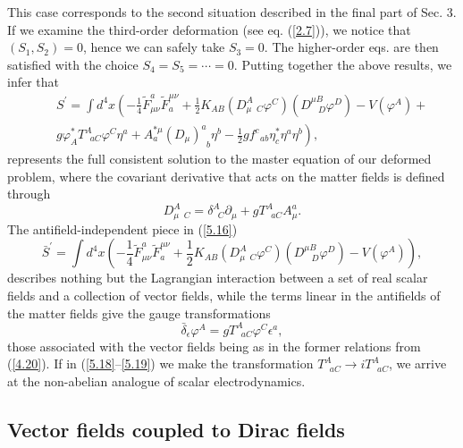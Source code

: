 \documentclass[a4paper,12pt]{article}
\begin{document}
This case corresponds to the second
situation described in the final part of
Sec. 3. If we examine the third-order
deformation (see eq. (\ref{2.7})), we
notice that $\left( S_{1},S_{2}\right) =0$,
hence we can safely take $S_{3}=0
$. The higher-order eqs. are then
satisfied with the choice $%
S_{4}=S_{5}=\cdots =0$. Putting together
the above results, we infer that
\begin{eqnarray}
&&S^{\prime }=\int d^{4}x\left( -
\frac{1}{4}\tilde{F}_{\mu \nu }^{a}\tilde{F}%
_{a}^{\mu \nu }+\frac{1}{2}K_{AB}
\left( D_{\mu \;\;C}^{A}\varphi ^{C}\right)
\left( D_{\;\;\;D}^{\mu B}\varphi ^{D}\right) -
V\left( \varphi ^{A}\right)
+\right.   \nonumber \\
&&\left. g\varphi _{A}^{*}
T_{\;\;aC}^{A}\varphi ^{C}\eta ^{a}+A_{a}^{*\mu
}\left( D_{\mu }\right) _{\;\;b}^{a}
\eta ^{b}-\frac{1}{2}gf_{\;\;ab}^{c}\eta
_{c}^{*}\eta ^{a}\eta ^{b}\right) ,  \label{5.16}
\end{eqnarray}
represents the full consistent solution
to the master equation of our
deformed problem, where the covariant
derivative that acts on the matter
fields is defined through
\begin{equation}
D_{\mu \;\;C}^{A}=\delta _{\;\;C}^{A}\partial _{\mu }+
gT_{\;\;aC}^{A}A_{\mu
}^{a}.  \label{5.17}
\end{equation}
The antifield-independent piece in (\ref{5.16})
\begin{equation}
\bar{S}^{\prime }=\int d^{4}x\left( -
\frac{1}{4}\tilde{F}_{\mu \nu }^{a}%
\tilde{F}_{a}^{\mu \nu }+\frac{1}{2}
K_{AB}\left( D_{\mu \;\;C}^{A}\varphi
^{C}\right) \left( D_{\;\;\;D}^{\mu B}
\varphi ^{D}\right) -V\left( \varphi
^{A}\right) \right) ,  \label{5.18}
\end{equation}
describes nothing but the Lagrangian
interaction between a set of real
scalar fields and a collection of vector
fields, while the terms linear in
the antifields of the matter fields give
the gauge transformations
\begin{equation}
\bar{\delta}_{\epsilon }\varphi ^{A}=
gT_{\;\;aC}^{A}\varphi ^{C}\epsilon
^{a},  \label{5.19}
\end{equation}
those associated with the vector fields
being as in the former relations
from (\ref{4.20}). If in
(\ref{5.18}--\ref{5.19}) we make the transformation
$T_{\;\;aC}^{A}\rightarrow iT_{\;\;aC}^{A}$,
we arrive at the non-abelian
analogue of scalar electrodynamics.

\subsection{Vector fields coupled to Dirac fields}
\end{document}
